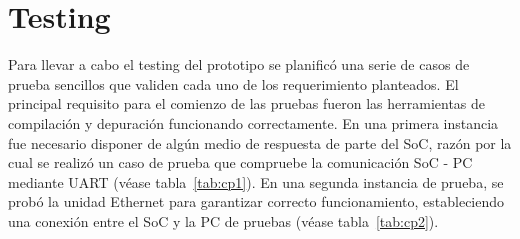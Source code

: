 		

		\section{Testing} \label {testing:proto1}

Para llevar a cabo el testing del prototipo se planificó una serie de casos de prueba sencillos que validen cada uno de los requerimiento planteados.
El principal requisito para el comienzo de las pruebas fueron las herramientas de compilación y depuración funcionando correctamente. En una primera
instancia fue necesario disponer de algún medio de respuesta de parte del SoC, razón por la cual se realizó un caso de prueba que compruebe la
comunicación SoC - PC mediante UART (véase tabla~\ref{tab:cp1}).  En una segunda instancia de prueba, se probó la unidad Ethernet para garantizar correcto funcionamiento, estableciendo una conexión entre el SoC y la PC de pruebas (véase tabla~\ref{tab:cp2}). 

